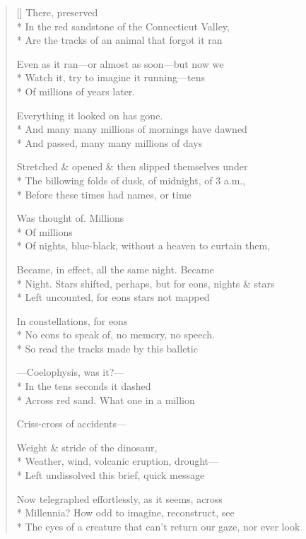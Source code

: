 \label{ch:triassic_sandstone}
\settowidth{\versewidth}{The eyes of a creature that can't return our gaze, nor ever look}
\begin{verse}[\versewidth]
    There, preserved\\*
In the red sandstone of the Connecticut Valley,\\*
Are the tracks of an animal that forgot it ran 

Even as it ran---or almost as soon---but now we\\*
Watch it, try to imagine it running---tens \\*
Of millions of years later.

Everything it looked on has gone.\\*
And many many millions of mornings have dawned\\*
And passed, many many millions of days

Stretched \& opened \& then slipped themselves under\\*
The billowing folds of dusk, of midnight, of 3 a.m.,\\*
Before these times had names, or time

Was thought of.     Millions\\*
Of millions\\*
Of nights, blue-black, without a heaven to curtain them,

Became, in effect, all the same night. Became \\*
Night. Stars shifted, perhaps, but for eons, nights \& stars\\*
Left uncounted, for eons stars not mapped

In constellations, for eons\\*
No eons to speak of, no memory, no speech.\\*
\hspace{4\vgap} So read the tracks made by this balletic

---Coelophysis, was it?---\\*
 In the tens seconds it dashed\\*
Across red sand. What one in a million

Criss-cross of accidents---

Weight \& stride of the dinosaur,\\*
Weather, wind, volcanic eruption, drought---\\*
Left undissolved this brief, quick message

Now telegraphed effortlessly, as it seems, across\\*
Millennia?  How odd to imagine, reconstruct, see\\*
The eyes of a creature that can't return our gaze, nor ever look


\end{verse}
